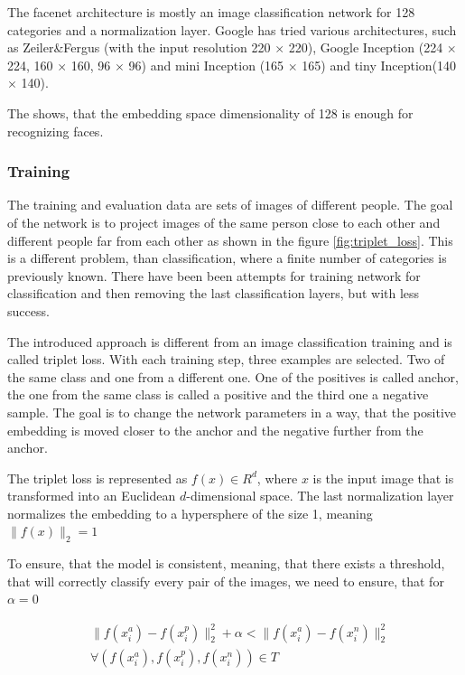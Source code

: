 \documentclass[a4paper,12pt,titlepage, twoside]{article}
\numberwithin{figure}{section}
\begin{document}
The facenet architecture is mostly an image classification network for 128 categories and a normalization layer. Google has tried various architectures, such as Zeiler\&Fergus \cite{zeiler2014visualizing} (with the input resolution 220 $\times$ 220), Google Inception \cite{szegedy2016rethinking} (224 $\times$ 224, 160 $\times$ 160, 96 $\times$ 96) and mini Inception (165 $\times$ 165) and tiny Inception(140 $\times$ 140). 


The \cite{szegedy2016rethinking} shows, that the embedding space dimensionality of 128 is enough for recognizing faces.

\subsubsection{Training}
The training and evaluation data are sets of images of different people. The goal of the network is to project images of the same person close to each other and different people far from each other as shown in the figure \ref{fig:triplet_loss}. This is a different problem, than classification, where a finite number of categories is previously known. There have been been attempts \cite{wst2008deeply, taigman2014deepface} for training network for classification and then removing the last classification layers, but with less success.

The introduced approach is different from an image classification training and is called triplet loss. With each training step, three examples are selected. Two of the same class and one from a different one. One of the positives is called anchor, the one from the same class is called a positive and the third one a negative sample. The goal is to change the network parameters in a way, that the positive embedding is moved closer to the anchor and the negative further from the anchor.

The triplet loss is represented as $f(x) \in R^d$, where $x$ is the input image that is transformed into an Euclidean $d$-dimensional space. The last normalization layer normalizes the embedding to a hypersphere of the size 1, meaning $\|f(x)\|_2 = 1$ 

To ensure, that the model is consistent, meaning, that there exists a threshold, that will correctly classify every pair of the images, we need to ensure, that for $\alpha = 0$

\begin{equation}
\begin{aligned}
&\|f(x_i^a) - f(x_i^p)\|^2_2 + \alpha < \|f(x_i^a) - f(x_i^n)\|^2_2 \\
&\forall (f(x_i^a), f(x_i^p), f(x_i^n)) \in T
\end{aligned}
\end{equation}
\end{document}
